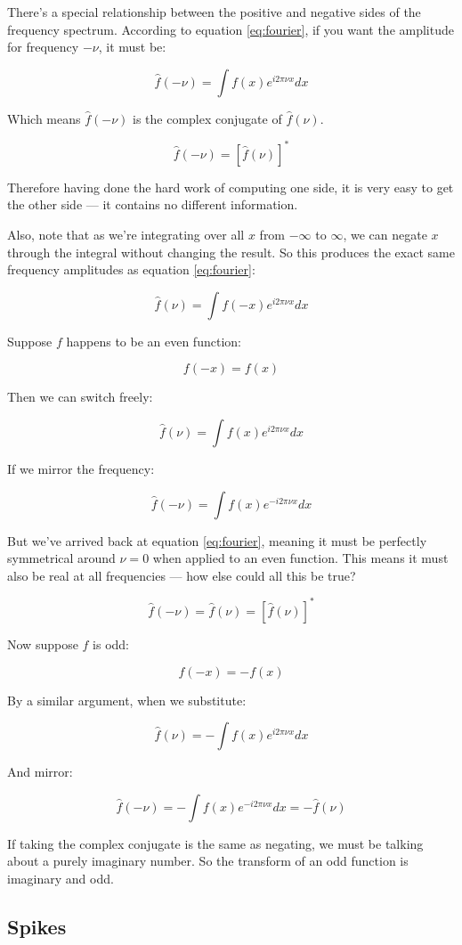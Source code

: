 There's a special relationship between the positive and negative sides of the frequency spectrum. According to equation \eqref{eq:fourier}, if you want the amplitude for frequency $-\nu$, it must be:

$$
\hat{f}(-\nu) = \int f(x)e^{i2\pi\nu x} dx
\label{3}
$$

Which means $\hat{f}(-\nu)$ is the complex conjugate of $\hat{f}(\nu)$.

$$
\hat{f}(-\nu) = \left[ \hat{f}(\nu) \right]^*
$$

Therefore having done the hard work of computing one side, it is very easy to get the other side --- it contains no different information.

Also, note that as we're integrating over all $x$ from $-\infty$ to $\infty$, we can negate $x$ through the integral without changing the result. So this produces the exact same frequency amplitudes as equation \eqref{eq:fourier}:

$$\hat{f}(\nu) = \int f(-x)e^{i2\pi\nu x} dx$$

Suppose $f$ happens to be an even function:

$$f(-x) = f(x)$$

Then we can switch freely:

$$\hat{f}(\nu) = \int f(x)e^{i2\pi\nu x} dx$$

If we mirror the frequency:

$$\hat{f}(-\nu) = \int f(x)e^{-i2\pi\nu x} dx$$

But we've arrived back at equation \eqref{eq:fourier}, meaning it must be perfectly symmetrical around $\nu = 0$ when applied to an even function. This means it must also be real at all frequencies --- how else could all this be true?

$$
\hat{f}(-\nu) = \hat{f}(\nu) = \left[ \hat{f}(\nu) \right]^*
$$

Now suppose $f$ is odd:

$$f(-x) = -f(x)$$

By a similar argument, when we substitute:

$$
\hat{f}(\nu) = - \int f(x)e^{i2\pi\nu x}
dx
$$

And mirror:

$$
\hat{f}(-\nu) = - \int f(x)e^{-i2\pi\nu x}
dx
= -\hat{f}(\nu)
$$

If taking the complex conjugate is the same as negating, we must be talking about a purely imaginary number. So the transform of an odd function is imaginary and odd.

\subsection{Spikes} \label{sec:fourier-spike}

